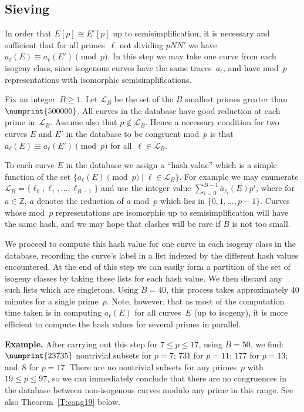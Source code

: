 \documentclass[12pt, reqno]{amsart}
\newcommand{\Z}{\mathbb{Z}}
\newcommand{\calL}{\mathcal{L}}
\numberwithin{equation}{section}
\theoremstyle{definition}
\theoremstyle{remark}
\begin{document}
\subsection{Sieving}
In order that $E[p]\cong E'[p]$ up to semisimplification, it is
necessary and sufficient that for all primes~$\ell$ not dividing
$pNN'$ we have $a_{\ell}(E)\equiv a_{\ell}(E')\pmod{p}$.  In this step
we may take one curve from each isogeny class, since isogenous curves
have the same traces~$a_\ell$, and have mod~$p$ representations with
isomorphic semisimplifications.

Fix an integer~$B\ge1$.  Let $\calL_B$ be the set of the $B$ smallest
primes greater than $\numprint{500000}$. All curves in the database
have good reduction at each prime in~$\calL_B$.  Assume also that
$p\notin\calL_B$. Hence a necessary condition for
two curves $E$ and $E'$ in the database to be congruent mod~$p$ is
that $a_{\ell}(E)\equiv a_{\ell}(E')\pmod{p}$ for all~$\ell\in\calL_B$.

To each curve $E$ in the database we assign a ``hash value'' which is
a simple function of the set $\{a_{\ell}(E)\pmod{p}\mid
\ell\in\calL_B\}$.  For example we may enumerate
$\calL_B=\{\ell_0,\ell_1,\dots,\ell_{B-1}\}$ and use the integer value
$\sum_{i=0}^{B-1}\overline{a}_{\ell_i}(E)p^i$, where for $a\in\Z$,
$\overline{a}$ denotes the reduction of $a$ mod~$p$ which lies in
$\{0,1,\dots,p-1\}$.  Curves whose mod~$p$ representations are
isomorphic up to semisimplification will have the same hash, and we
may hope that clashes will be rare if $B$ is not too small.

We proceed to compute this hash value for one curve in each isogeny
class in the database, recording the curve's label in a list indexed
by the different hash values encountered.  At the end of this step we
can easily form a partition of the set of isogeny classes by taking
these lists for each hash value.  We then discard any such lists which
are singletons.  Using $B=40$, this process takes approximately 40
minutes for a single prime~$p$.  Note, however, that as most of the
computation time taken is in computing $a_{\ell}(E)$ for all
curves~$E$ (up to isogeny), it is more efficient to compute the hash
values for several primes in parallel.

{\bf Example.} After carrying out this step for $7\le p\le17$, using
$B=50$, we find: $\numprint{23735}$ nontrivial subsets for $p=7$;
$731$ for $p=11$; $177$ for $p=13$; and~$8$ for $p=17$.  There are no
nontrivial subsets for any primes~$p$ with $19\le p\le97$, so we can
immediately conclude that there are no congruences in the database
between non-isogenous curves modulo any prime in this range.  See also
Theorem~\ref{T:cong19} below.
\end{document}
